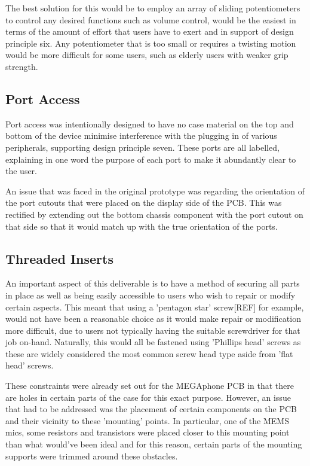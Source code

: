 The best solution for this would be to employ an array of sliding potentiometers to control any desired functions such as volume control, would be the easiest in terms of the amount of effort that users have to exert and in support of design principle six.
Any potentiometer that is too small or requires a twisting motion would be more difficult for some users, such as elderly users with weaker grip strength.

\subsection{Port Access}

Port access was intentionally designed to have no case material on the top and bottom of the device minimise interference with the plugging in of various peripherals, supporting design principle seven.
These ports are all labelled, explaining in one word the purpose of each port to make it abundantly clear to the user.

An issue that was faced in the original prototype was regarding the orientation of the port cutouts that were placed on the display side of the PCB.
This was rectified by extending out the bottom chassis component with the port cutout on that side so that it would match up with the true orientation of the ports. %

\subsection{Threaded Inserts}

An important aspect of this deliverable is to have a method of securing all parts in place as well as being easily accessible to users who wish to repair or modify certain aspects.
This meant that using a 'pentagon star' screw[REF] for example, would not have been a reasonable choice as it would make repair or modification more difficult, due to users not typically having the suitable screwdriver for that job on-hand.
Naturally, this would all be fastened using 'Phillips head' screws as these are widely considered the most common screw head type aside from 'flat head' screws.

These constraints were already set out for the MEGAphone PCB in that there are holes in certain parts of the case for this exact purpose.
However, an issue that had to be addressed was the placement of certain components on the PCB and their vicinity to these 'mounting' points.
In particular, one of the MEMS mics, some resistors and transistors were placed closer to this mounting point than what would've been ideal and for this reason, certain parts of the mounting supports were trimmed around these obstacles.

